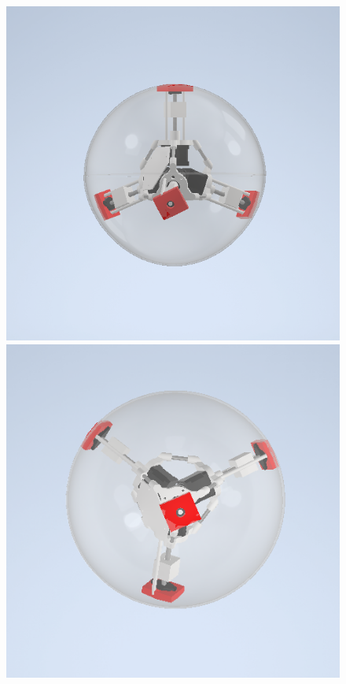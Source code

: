\documentclass[a4paper]{ctexart}
\numberwithin{equation}{section}
\numberwithin{table}{section}
\numberwithin{figure}{section}
\begin{document}
\begin{figure}[H]
  \begin{minipage}{0.32\linewidth}
    \begin{center}
      \includegraphics[width=0.98\linewidth]{figures/rendered1.png}
    \end{center}
  \end{minipage}
  \hfill
  \begin{minipage}{0.32\linewidth}
    \begin{center}
      \includegraphics[width=0.98\linewidth]{figures/rendered2.png}

\end{center}
\end{minipage}
\end{figure}
\end{document}
